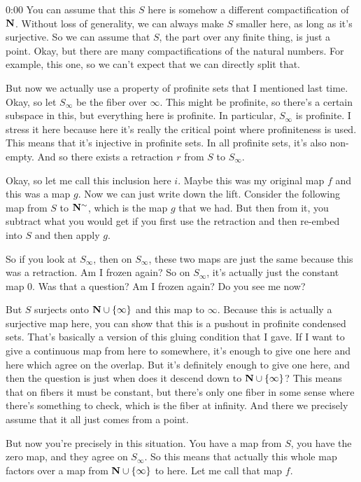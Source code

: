 \begin{unfinished}{0:00}
You can assume that this $S$ here is somehow a different compactification of $\mathbf N$. Without loss of generality, we can always make $S$ smaller here, as long as it's surjective. So we can assume that $S$, the part over any finite thing, is just a point. Okay, but there are many compactifications of the natural numbers. For example, this one, so we can't expect that we can directly split that.

But now we actually use a property of profinite sets that I mentioned last time. Okay, so let $S_\infty$ be the fiber over $\infty$. This might be profinite, so there's a certain subspace in this, but everything here is profinite. In particular, $S_\infty$ is profinite. I stress it here because here it's really the critical point where profiniteness is used. This means that it's injective in profinite sets. In all profinite sets, it's also non-empty. And so there exists a retraction $r$ from $S$ to $S_\infty$.

Okay, so let me call this inclusion here $i$. Maybe this was my original map $f$ and this was a map $g$. Now we can just write down the lift. Consider the following map from $S$ to $\mathbf N^\sim$, which is the map $g$ that we had. But then from it, you subtract what you would get if you first use the retraction and then re-embed into $S$ and then apply $g$.

So if you look at $S_\infty$, then on $S_\infty$, these two maps are just the same because this was a retraction. Am I frozen again? So on $S_\infty$, it's actually just the constant map $0$. Was that a question? Am I frozen again? Do you see me now?

But $S$ surjects onto $\mathbf N \cup \{\infty\}$ and this map to $\infty$. Because this is actually a surjective map here, you can show that this is a pushout in profinite condensed sets. That's basically a version of this gluing condition that I gave. If I want to give a continuous map from here to somewhere, it's enough to give one here and here which agree on the overlap. But it's definitely enough to give one here, and then the question is just when does it descend down to $\mathbf N \cup \{\infty\}$? This means that on fibers it must be constant, but there's only one fiber in some sense where there's something to check, which is the fiber at infinity. And there we precisely assume that it all just comes from a point.

But now you're precisely in this situation. You have a map from $S$, you have the zero map, and they agree on $S_\infty$. So this means that actually this whole map factors over a map from $\mathbf N \cup \{\infty\}$ to here. Let me call that map $f$.


\end{unfinished}
